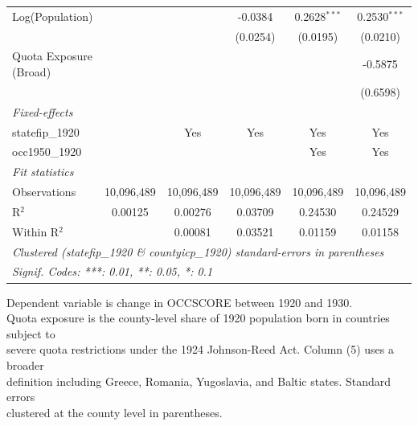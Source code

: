\begin{table}[htbp]
\begin{tabular}{lccccc}
      Log(Population)        &                &                & -0.0384         & 0.2628$^{***}$  & 0.2530$^{***}$\\   
                             &                &                & (0.0254)        & (0.0195)        & (0.0210)\\   
      Quota Exposure (Broad) &                &                &                 &                 & -0.5875\\   
                             &                &                &                 &                 & (0.6598)\\   
      \midrule
      \emph{Fixed-effects}\\
      statefip\_1920         &                & Yes            & Yes             & Yes             & Yes\\  
      occ1950\_1920          &                &                &                 & Yes             & Yes\\  
      \midrule
      \emph{Fit statistics}\\
      Observations           & 10,096,489     & 10,096,489     & 10,096,489      & 10,096,489      & 10,096,489\\  
      R$^2$                  & 0.00125        & 0.00276        & 0.03709         & 0.24530         & 0.24529\\  
      Within R$^2$           &                & 0.00081        & 0.03521         & 0.01159         & 0.01158\\  
      \midrule \midrule
      \multicolumn{6}{l}{\emph{Clustered (statefip\_1920 \& countyicp\_1920) standard-errors in parentheses}}\\
      \multicolumn{6}{l}{\emph{Signif. Codes: ***: 0.01, **: 0.05, *: 0.1}}\\
   \end{tabular}
   
   \par \raggedright 
   Dependent variable is change in OCCSCORE between 1920 and 1930.\\
   Quota exposure is the county-level share of 1920 population born in countries subject to\\
   severe quota restrictions under the 1924 Johnson-Reed Act. Column (5) uses a broader\\
   definition including Greece, Romania, Yugoslavia, and Baltic states. Standard errors\\
   clustered at the county level in parentheses.
\end{table}


